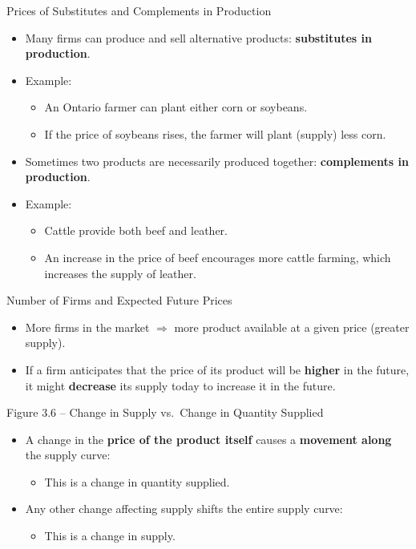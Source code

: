 \documentclass[aspectratio=169]{beamer}
\begin{document}
\begin{frame}{Prices of Substitutes and Complements in Production}
\transfade
\begin{itemize}
  \item Many firms can produce and sell alternative products: \textbf{substitutes in production}.
  \item Example:
  \begin{itemize}
    \item An Ontario farmer can plant either corn or soybeans.
    \item If the price of soybeans rises, the farmer will plant (supply) less corn.
  \end{itemize}
  \item Sometimes two products are necessarily produced together: \textbf{complements in production}.
  \item Example:
  \begin{itemize}
    \item Cattle provide both beef and leather.
    \item An increase in the price of beef encourages more cattle farming, which increases the supply of leather.
  \end{itemize}
\end{itemize}
\end{frame}

\begin{frame}{Number of Firms and Expected Future Prices}
\transfade
\begin{itemize}
  \item More firms in the market \(\Rightarrow\) more product available at a given price (greater supply).
  \item If a firm anticipates that the price of its product will be \textbf{higher} in the future, it might \textbf{decrease} its supply today to increase it in the future.
\end{itemize}
\end{frame}

\begin{frame}{Figure 3.6 -- Change in Supply vs.\ Change in Quantity Supplied}
\transfade
\begin{itemize}
  \item A change in the \textbf{price of the product itself} causes a \textbf{movement along} the supply curve:
  \begin{itemize}
    \item This is a \alert{change in quantity supplied}.
  \end{itemize}
  \item Any other change affecting supply shifts the entire supply curve:
  \begin{itemize}
    \item This is a \alert{change in supply}.
  \end{itemize}
\end{itemize}
\end{frame}
\end{document}
